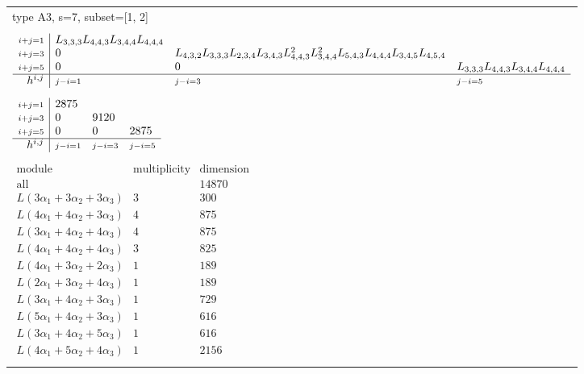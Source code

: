 \documentclass[crop,border=2mm]{standalone}
\begin{document}
\begin{tabular}{l}
{\huge type A3, s=7, subset=[1, 2]}\\ \\


$\displaystyle
\begin{array}{r|l l l}
	{\scriptstyle i+j=1}&L_{3,3,3}L_{4,4,3}L_{3,4,4}L_{4,4,4}&&\\
	{\scriptstyle i+j=3}&0&L_{4,3,2}L_{3,3,3}L_{2,3,4}L_{3,4,3}L_{4,4,3}^{2}L_{3,4,4}^{2}L_{5,4,3}L_{4,4,4}L_{3,4,5}L_{4,5,4}&\\
	{\scriptstyle i+j=5}&0&0&L_{3,3,3}L_{4,4,3}L_{3,4,4}L_{4,4,4}\\
	\hline h^{i,j}&{\scriptstyle j-i=1}&{\scriptstyle j-i=3}&{\scriptstyle j-i=5}
\end{array}
$ \\ \\


$\displaystyle
\begin{array}{r|l l l}
	{\scriptstyle i+j=1}&2875&&\\
	{\scriptstyle i+j=3}&0&9120&\\
	{\scriptstyle i+j=5}&0&0&2875\\
	\hline h^{i,j}&{\scriptstyle j-i=1}&{\scriptstyle j-i=3}&{\scriptstyle j-i=5}
\end{array}
$ \\ \\


$\displaystyle
\begin{array}{rll}
	\text{module}&\text{multiplicity}&\text{dimension} \\ \hline \text{all}&&14870 \\
	L\left( 3\alpha_{1}+ 3\alpha_{2}+ 3\alpha_{3}\right)&3&300\\
	L\left( 4\alpha_{1}+ 4\alpha_{2}+ 3\alpha_{3}\right)&4&875\\
	L\left( 3\alpha_{1}+ 4\alpha_{2}+ 4\alpha_{3}\right)&4&875\\
	L\left( 4\alpha_{1}+ 4\alpha_{2}+ 4\alpha_{3}\right)&3&825\\
	L\left( 4\alpha_{1}+ 3\alpha_{2}+ 2\alpha_{3}\right)&1&189\\
	L\left( 2\alpha_{1}+ 3\alpha_{2}+ 4\alpha_{3}\right)&1&189\\
	L\left( 3\alpha_{1}+ 4\alpha_{2}+ 3\alpha_{3}\right)&1&729\\
	L\left( 5\alpha_{1}+ 4\alpha_{2}+ 3\alpha_{3}\right)&1&616\\
	L\left( 3\alpha_{1}+ 4\alpha_{2}+ 5\alpha_{3}\right)&1&616\\
	L\left( 4\alpha_{1}+ 5\alpha_{2}+ 4\alpha_{3}\right)&1&2156
\end{array}
$ \\ \\

\end{tabular}
\end{document}

